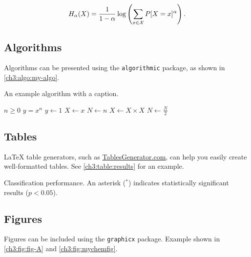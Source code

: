 \begin{equation}
\label{ch3:eq:renyi}
H_{\alpha}(X) =
\frac{1}{1-\alpha}
\log \left(\sum_{x \in {\cal X}}P[X=x]^{\alpha} \right) .
\end{equation}

\subsection{Algorithms}
\begin{subparagraph}
Algorithms can be presented using the \texttt{algorithmic} package, as shown in \autoref{ch3:algo:my-algo}.
\end{subparagraph}

\begin{algorithm}[h]
\caption{An example algorithm with a caption.}
\label{ch3:algo:my-algo}
\normalsize\singlespacing
\begin{algorithmic}[1]
    \Require $n \geq 0$
    \Ensure $y = x^n$
    \State $y \gets 1$
    \State $X \gets x$
    \State $N \gets n$
            \State $X \gets X \times X$
            \State $N \gets \frac{N}{2}$ 
    \EndWhile
\end{algorithmic}
\end{algorithm}

\subsection{Tables}
\begin{subparagraph}
{\LaTeX} table generators, such as \href{https://www.tablesgenerator.com/}{TablesGenerator.com}, can help you easily create well-formatted tables. See \autoref{ch3:table:results} for an example.
\end{subparagraph}

\begin{table}[ht]
\caption{Classification performance. An asterisk ($^*$) indicates statistically significant results ($p<0.05$).}
\label{ch3:table:results}
\centering
\normalsize\singlespacingplus

\end{table}

\subsection{Figures}
\begin{subparagraph}
Figures can be included using the \texttt{graphicx} package. Example shown in \autoref{ch3:fig:fig-A} and \autoref{ch3:fig:mychemfig}.
\end{subparagraph}

